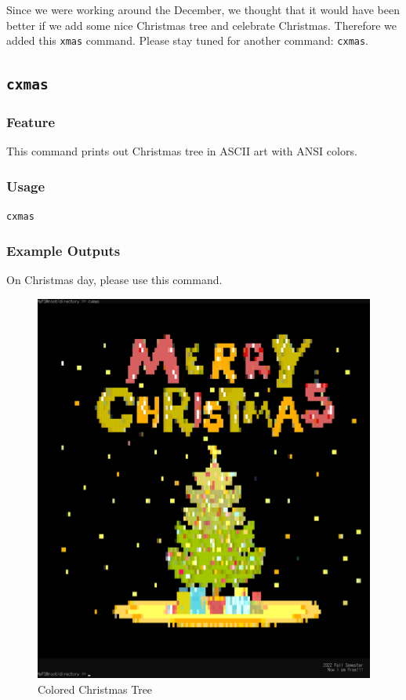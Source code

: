 \documentclass{homework}
\begin{document}
Since we were working around the December, we thought that it would have been better if we add some nice Christmas tree and celebrate Christmas. Therefore we added this \texttt{xmas} command. Please stay tuned for another command: \texttt{cxmas}.
\pagebreak

\subsection{\texttt{cxmas}}
\subsubsection{Feature}
This command prints out Christmas tree in ASCII art with ANSI colors.
\subsubsection{Usage}
\begin{center}
\texttt{cxmas}
\end{center}

\subsubsection{Example Outputs}
On Christmas day, please use this command.
\\
\begin{figure}[h]
\begin{center}
\includegraphics[scale=0.36]{cxmas.png}    
\caption{Colored Christmas Tree}
\end{center}
\end{figure}
\pagebreak
\end{document}
